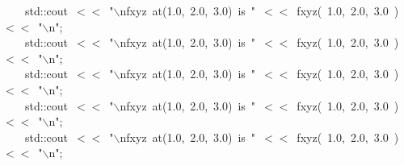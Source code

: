 \documentclass[9pt,onside]{article}
\newcommand{\hlstd}[1]{\textcolor[rgb]{0.2,0,0.4}{#1}}
\newcommand{\hlnum}[1]{\textcolor[rgb]{0.2,0.73,0.02}{#1}}
\newcommand{\hlesc}[1]{\textcolor[rgb]{0.65,0.09,0.38}{#1}}
\newcommand{\hlstr}[1]{\textcolor[rgb]{0.09,0.38,0.65}{#1}}
\newcommand{\hlopt}[1]{\textcolor[rgb]{0.33,0.33,0.33}{#1}}
\newcommand{\hlkwd}[1]{\textcolor[rgb]{0.82,0.11,0.93}{#1}}
\begin{document}
{{}\hlstd{\ \ \ \ }\hlstd{std}\hlopt{::}\hlstd{cout\ }\hlopt{$<$$<$\ }\hlstd{}\hlstr{"}\hlesc{$\backslash$n}\hlstr{fxyz\ at(1.0,\ 2.0,\ 3.0)\ is\ "}\hlstd{\ }\hlopt{$<$$<$\ }\hlstd{}\hlkwd{fxyz}\hlstd{}\hlopt{(\ }\hlstd{}\hlnum{1.0}\hlstd{}\hlopt{,\ }\hlstd{}\hlnum{2.0}\hlstd{}\hlopt{,\ }\hlstd{}\hlnum{3.0\ }\hlstd{}\hlopt{)\ $<$$<$\ }\hlstd{}\hlstr{"}\hlesc{$\backslash$n}\hlstr{"}\hlstd{}\hlopt{;}\hspace*{\fill}\\
\hlstd{}\hlstd{\ \ \ \ }\hlstd{std}\hlopt{::}\hlstd{cout\ }\hlopt{$<$$<$\ }\hlstd{}\hlstr{"}\hlesc{$\backslash$n}\hlstr{fxyz\ at(1.0,\ 2.0,\ 3.0)\ is\ "}\hlstd{\ }\hlopt{$<$$<$\ }\hlstd{}\hlkwd{fxyz}\hlstd{}\hlopt{(\ }\hlstd{}\hlnum{1.0}\hlstd{}\hlopt{,\ }\hlstd{}\hlnum{2.0}\hlstd{}\hlopt{,\ }\hlstd{}\hlnum{3.0\ }\hlstd{}\hlopt{)\ $<$$<$\ }\hlstd{}\hlstr{"}\hlesc{$\backslash$n}\hlstr{"}\hlstd{}\hlopt{;}\hspace*{\fill}\\
\hlstd{}\hlstd{\ \ \ \ }\hlstd{std}\hlopt{::}\hlstd{cout\ }\hlopt{$<$$<$\ }\hlstd{}\hlstr{"}\hlesc{$\backslash$n}\hlstr{fxyz\ at(1.0,\ 2.0,\ 3.0)\ is\ "}\hlstd{\ }\hlopt{$<$$<$\ }\hlstd{}\hlkwd{fxyz}\hlstd{}\hlopt{(\ }\hlstd{}\hlnum{1.0}\hlstd{}\hlopt{,\ }\hlstd{}\hlnum{2.0}\hlstd{}\hlopt{,\ }\hlstd{}\hlnum{3.0\ }\hlstd{}\hlopt{)\ $<$$<$\ }\hlstd{}\hlstr{"}\hlesc{$\backslash$n}\hlstr{"}\hlstd{}\hlopt{;}\hspace*{\fill}\\
\hlstd{}\hlstd{\ \ \ \ }\hlstd{std}\hlopt{::}\hlstd{cout\ }\hlopt{$<$$<$\ }\hlstd{}\hlstr{"}\hlesc{$\backslash$n}\hlstr{fxyz\ at(1.0,\ 2.0,\ 3.0)\ is\ "}\hlstd{\ }\hlopt{$<$$<$\ }\hlstd{}\hlkwd{fxyz}\hlstd{}\hlopt{(\ }\hlstd{}\hlnum{1.0}\hlstd{}\hlopt{,\ }\hlstd{}\hlnum{2.0}\hlstd{}\hlopt{,\ }\hlstd{}\hlnum{3.0\ }\hlstd{}\hlopt{)\ $<$$<$\ }\hlstd{}\hlstr{"}\hlesc{$\backslash$n}\hlstr{"}\hlstd{}\hlopt{;}\hspace*{\fill}\\
\hlstd{}\hlstd{\ \ \ \ }\hlstd{std}\hlopt{::}\hlstd{cout\ }\hlopt{$<$$<$\ }\hlstd{}\hlstr{"}\hlesc{$\backslash$n}\hlstr{fxyz\ at(1.0,\ 2.0,\ 3.0)\ is\ "}\hlstd{\ }\hlopt{$<$$<$\ }\hlstd{}\hlkwd{fxyz}\hlstd{}\hlopt{(\ }\hlstd{}\hlnum{1.0}\hlstd{}\hlopt{,\ }\hlstd{}\hlnum{2.0}\hlstd{}\hlopt{,\ }\hlstd{}\hlnum{3.0\ }\hlstd{}\hlopt{)\ $<$$<$\ }\hlstd{}\hlstr{"}\hlesc{$\backslash$n}\hlstr{"}\hlstd{}\hlopt{;}\hspace*{\fill}\\
}
\end{document}
